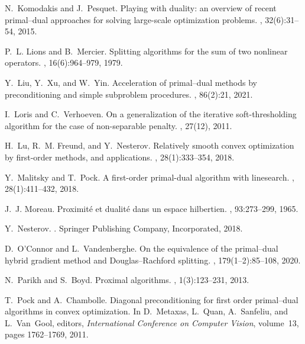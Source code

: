 \documentclass[letterpaper,11pt]{article}
\begin{document}
\begin{thebibliography}{10}
N.~Komodakis and J.~Pesquet.
\newblock Playing with duality: an overview of recent primal--dual approaches
  for solving large-scale optimization problems.
, 32(6):31--54, 2015.

P.~L. Lions and B.~Mercier.
\newblock Splitting algorithms for the sum of two nonlinear operators.
, 16(6):964--979, 1979.

Y.~Liu, Y.~Xu, and W.~Yin.
\newblock Acceleration of primal--dual methods by preconditioning and simple
  subproblem procedures.
, 86(2):21, 2021.

I.~Loris and C.~Verhoeven.
\newblock On a generalization of the iterative soft-thresholding algorithm for
  the case of non-separable penalty.
, 27(12), 2011.

H.~Lu, R.~M. Freund, and Y.~Nesterov.
\newblock Relatively smooth convex optimization by first-order methods, and
  applications.
, 28(1):333--354, 2018.

Y.~Malitsky and T.~Pock.
\newblock A first-order primal-dual algorithm with linesearch.
, 28(1):411--432, 2018.

J.~J. Moreau.
\newblock Proximit\'e et dualit\'e dans un espace hilbertien.
, 93:273--299, 1965.

Y.~Nesterov.
.
\newblock Springer Publishing Company, Incorporated, 2018.

D.~O’Connor and L.~Vandenberghe.
\newblock On the equivalence of the primal--dual hybrid gradient method and
  {Douglas--Rachford} splitting.
, 179(1--2):85--108, 2020.

N.~Parikh and S.~Boyd.
\newblock Proximal algorithms.
, 1(3):123--231, 2013.

T.~Pock and A.~Chambolle.
\newblock Diagonal preconditioning for first order primal--dual algorithms in
  convex optimization.
\newblock In D.~Metaxas, L.~Quan, A.~Sanfeliu, and L.~Van~Gool, editors, {\em
  International Conference on Computer Vision}, volume~13, pages 1762--1769,
  2011.


\end{thebibliography}
\end{document}
